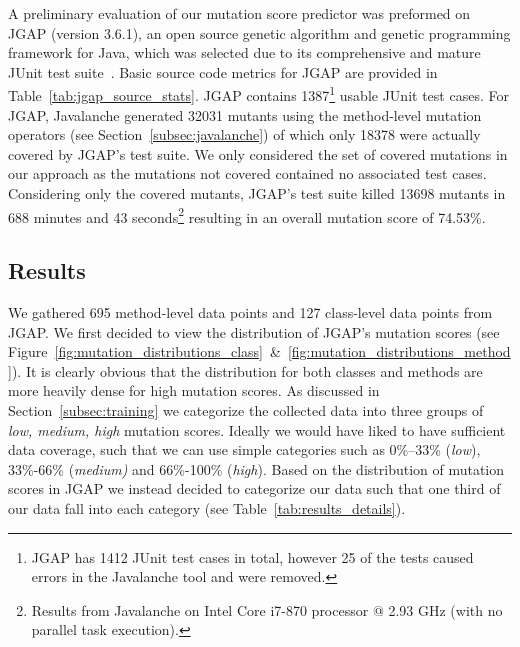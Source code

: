 \documentclass[10pt,conference,compsocconf]{IEEEtran}
\begin{document}
A preliminary evaluation of our mutation score predictor was preformed on JGAP (version 3.6.1), an open source genetic algorithm and genetic programming framework for Java, which was selected due to its comprehensive and mature JUnit test suite~\cite{JGAP}. Basic source code metrics for JGAP are provided in Table~\ref{tab:jgap_source_stats}. JGAP contains 1387\footnote{JGAP has 1412 JUnit test cases in total, however 25 of the tests caused errors in the Javalanche tool and were removed.} usable JUnit test cases. For JGAP, Javalanche generated 32031 mutants using the method-level mutation operators (see Section~\ref{subsec:javalanche}) of which only 18378 were actually covered by JGAP's test suite. We only considered the set of covered mutations in our approach as the mutations not covered contained no associated test cases. Considering only the covered mutants, JGAP's test suite killed 13698 mutants in 688 minutes and 43 seconds\footnote{Results from Javalanche on Intel Core i7-870 processor @ 2.93 GHz (with no parallel task execution).} resulting in an overall mutation score of 74.53\%.


\subsection{Results}
\label{subsec:results}
We gathered 695 method-level data points and 127 class-level data points from JGAP. We first decided to view the distribution of JGAP's mutation scores (see Figure~\ref{fig:mutation_distributions_class}~\&~\ref{fig:mutation_distributions_method}). It is clearly obvious that the distribution for both classes and methods are more heavily dense for high mutation scores. As discussed in Section~\ref{subsec:training} we categorize the collected data into three groups of \textit{low, medium, high} mutation scores. Ideally we would have liked to have sufficient data coverage, such that we can use simple categories such as 0\%--33\% (\textit{low}), 33\%-66\% (\textit{medium)} and 66\%-100\% (\textit{high}). Based on the distribution of mutation scores in JGAP we instead decided to categorize our data such that one third of our data fall into each category (see Table~\ref{tab:results_details}).
\end{document}
